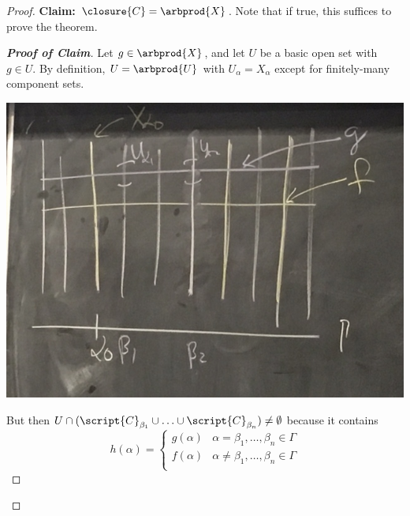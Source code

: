 \documentclass[a5paper]{article}
\theoremstyle{definition}%
\numberwithin{exercise}{section}
\theoremstyle{remark}%
\begin{document}
\begin{proof}
\noindent \textbf{Claim:} $\closure{C}=\arbprod{X}$. Note that if true, this suffices to prove the theorem.
\begin{proof}[\textbf{Proof of Claim}]\let\qed\relax
Let $g\in\arbprod{X}$, and let $U$ be a basic open set with $g\in U$. By definition, $U=\arbprod{U}$ with $U_\alpha = X_\alpha$ except for finitely-many component sets. 

\begin{center}
\includegraphics[scale=.3]{images/thm54_2}
\end{center}

But then $U\cap(\script{C}_{\beta_1} \cup \ldots \cup \script{C}_{\beta_n})\neq\emptyset$ because it contains 
\[h(\alpha)=
\begin{cases}
g(\alpha) & \alpha=\beta_1, \ldots, \beta_n \in \Gamma\\
f(\alpha) & \alpha\neq\beta_1, \ldots, \beta_n \in \Gamma\\
\end{cases}\]
\end{proof}
\end{proof}
\end{document}
